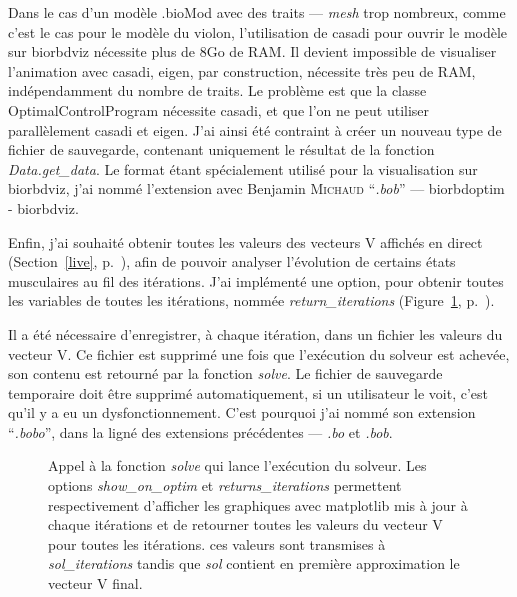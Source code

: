 Dans le cas d'un modèle .bioMod avec des traits --- \emph{mesh} trop nombreux, comme c'est le cas pour le modèle du violon, l'utilisation de \gls{casadi} pour ouvrir le modèle sur \gls{biorbdviz} nécessite plus de 8Go de RAM. Il devient impossible de visualiser l'animation avec \gls{casadi}, \gls{eigen}, par construction, nécessite très peu de RAM, indépendamment du nombre de traits. Le problème est que la classe OptimalControlProgram nécessite \gls{casadi}, et que l'on ne peut utiliser parallèlement \gls{casadi} et \gls{eigen}. J'ai ainsi été contraint à créer un nouveau type de fichier de sauvegarde, contenant uniquement le résultat de la fonction \emph{Data.get\_data}. Le format étant spécialement utilisé pour la visualisation sur \gls{biorbdviz}, j'ai nommé l'extension avec Benjamin \textsc{Michaud} ``\emph{.bob}'' --- \gls{biorbdoptim} - \gls{biorbdviz}.

Enfin, j'ai souhaité obtenir toutes les valeurs des vecteurs V affichés en direct (Section~\ref{live}, p.~\pageref{live}), afin de pouvoir analyser l'évolution de certains états musculaires au fil des itérations. J'ai implémenté une option, pour obtenir toutes les variables de toutes les itérations, nommée \emph{return\_iterations} (Figure~\ref{fig:solve}, p.~\pageref{fig:solve}). 

Il a été nécessaire d’enregistrer, à chaque itération, dans un fichier les valeurs du vecteur V. Ce fichier est supprimé une fois que l'exécution du solveur est achevée, son contenu est retourné par la fonction \emph{solve}. Le fichier de sauvegarde temporaire doit être supprimé automatiquement, si un utilisateur le voit, c'est qu'il y a eu un dysfonctionnement. C'est pourquoi j'ai nommé son extension ``\emph{.bobo}'', dans la ligné des extensions précédentes --- \emph{.bo} et \emph{.bob}.

\begin{center}
\setlength\itemsep{-0.5em}

\vspace{-0.6cm}
\begin{figure}[h]
\caption{Appel à la fonction \emph{solve} qui lance l'exécution du solveur. Les options \emph{show\_on\_optim} et \emph{returns\_iterations} permettent respectivement d'afficher les graphiques avec \gls{matplotlib} mis à jour à chaque itérations et de retourner toutes les valeurs du vecteur V pour toutes les itérations. ces valeurs sont transmises à \emph{sol\_iterations} tandis que \emph{sol} contient en première approximation le vecteur V final.}
\label{fig:solve}
\end{figure}
\end{center}

